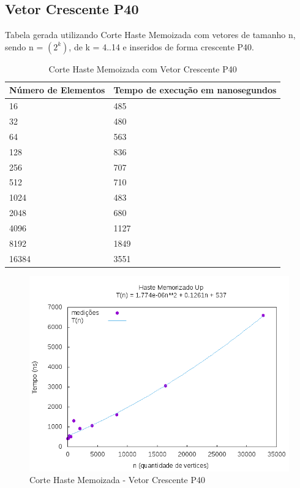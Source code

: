 \documentclass[12pt,a4paper,twoside]{report}
\begin{document}
\subsection{Vetor Crescente P40}
Tabela gerada utilizando Corte Haste Memoizada com vetores de tamanho n, sendo n = $(2^k)$, de k = 4..14 e inseridos de forma crescente P40.
\begin{table}[H]
\centering
\caption{Corte Haste Memoizada com Vetor Crescente P40}
\label{my-label}
\begin{tabular}{|l|l|}
\hline
\multicolumn{1}{|c|}{\textbf{Número de Elementos}} & \multicolumn{1}{c|}{\textbf{Tempo de execução em nanosegundos}} \\ \hline
16 & 485 \\ \hline
32 & 480 \\ \hline
64 & 563 \\ \hline
128 & 836 \\ \hline
256 & 707 \\ \hline
512 & 710 \\ \hline
1024 & 483 \\ \hline
2048 & 680 \\ \hline
4096 & 1127 \\ \hline
8192 & 1849 \\ \hline
16384 & 3551 \\ \hline
\end{tabular}
\end{table}

\begin{figure}[H]
    \centering
    \includegraphics[width=0.7\linewidth]{graficos/CorteHasteMemorizado/Crescente40/HasteMemo.png}
  \caption{Corte Haste Memoizada - Vetor Crescente P40}
\end{figure}
\end{document}
